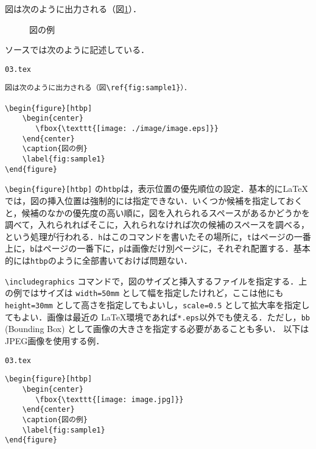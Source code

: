 図は次のように出力される（図\ref{fig:sample1}）．

\begin{figure}[htbp]
    \begin{center}
    \end{center}
    \caption{図の例}
    \label{fig:sample1}
\end{figure}

ソースでは次のように記述している．

\begin{itembox}[l]{\texttt{03.tex}}
\begin{verbatim}
図は次のように出力される（図\ref{fig:sample1}）．

\begin{figure}[htbp]
    \begin{center}
       \fbox{\texttt{[image: ./image/image.eps]}}
    \end{center}
    \caption{図の例}
    \label{fig:sample1}
\end{figure}
\end{verbatim}
\end{itembox}

\verb|\begin{figure}[htbp]|  の\texttt{htbp}は，表示位置の優先順位の設定．基本的に\LaTeX では，図の挿入位置は強制的には指定できない．いくつか候補を指定しておくと，候補のなかの優先度の高い順に，図を入れられるスペースがあるかどうかを調べて，入れられればそこに，入れられなければ次の候補のスペースを調べる，という処理が行われる．\texttt{h}はこのコマンドを書いたその場所に，\texttt{t}はページの一番上に，\texttt{b}はページの一番下に，\texttt{p}は画像だけ別ページに，それぞれ配置する．基本的には\texttt{htbp}のように全部書いておけば問題ない．

\verb|\includegraphics| コマンドで，図のサイズと挿入するファイルを指定する．上の例ではサイズは \texttt{width=50mm} として幅を指定したけれど，ここは他にも \texttt{height=30mm} として高さを指定してもよいし，\texttt{scale=0.5} として拡大率を指定してもよい．画像は最近の \LaTeX 環境であれば\texttt{*.eps}以外でも使える．ただし，\texttt{bb} (Bounding Box) として画像の大きさを指定する必要があることも多い．
以下はJPEG画像を使用する例．

\begin{itembox}[l]{\texttt{03.tex}}
\begin{verbatim}
\begin{figure}[htbp]
    \begin{center}
       \fbox{\texttt{[image: image.jpg]}}
    \end{center}
    \caption{図の例}
    \label{fig:sample1}
\end{figure}
\end{verbatim}
\end{itembox}


